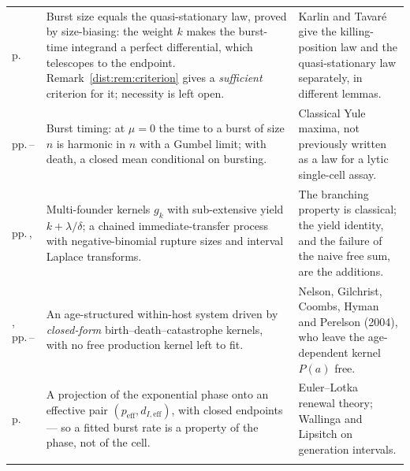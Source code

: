 {\begin{xltabular}{\linewidth}{@{}>{\raggedright\arraybackslash}p{20mm}O>{\raggedright\arraybackslash}p{40mm}@{}}
\newline p.\,\pageref{dist:thm:identity} &
Burst size equals the quasi-stationary law, proved by size-biasing: the weight $k$ makes
the burst-time integrand a perfect differential, which telescopes to the endpoint.
Remark~\ref{dist:rem:criterion} gives a \emph{sufficient} criterion for it; necessity is left open. &
Karlin and Tavar\'e give the killing-position law and the quasi-stationary law separately,
in different lemmas. \\
\addlinespace[5pt]

\newline pp.\,\pageref{dist:prop:taugivenk}--\pageref{dist:prop:tauburst} &
Burst timing: at $\mu=0$ the time to a burst of size $n$ is harmonic in $n$ with a Gumbel
limit; with death, a closed mean conditional on bursting. &
Classical Yule maxima, not previously written as a law for a lytic single-cell assay. \\
\addlinespace[5pt]

\newline pp.\,\pageref{dist:sec:moi}, \pageref{dist:sec:chained} &
Multi-founder kernels $g_k$ with sub-extensive yield $k+\lambda/\delta$; a chained
immediate-transfer process with negative-binomial rupture sizes and interval Laplace
transforms. &
The branching property is classical; the yield identity, and the failure of the naive free
sum, are the additions. \\
\addlinespace[5pt]

, \newline pp.\,\pageref{p:def:renewal-system}--\pageref{p:eq:skeleton} &
An age-structured within-host system driven by \emph{closed-form} birth--death--catastrophe
kernels, with no free production kernel left to fit. &
Nelson, Gilchrist, Coombs, Hyman and Perelson (2004), who leave the age-dependent kernel
$P(a)$ free. \\
\addlinespace[5pt]

\newline p.\,\pageref{p:thm:projection} &
A projection of the exponential phase onto an effective pair
$(p_{\mathrm{eff}},d_{I,\mathrm{eff}})$, with closed endpoints --- so a fitted burst rate
is a property of the phase, not of the cell. &
Euler--Lotka renewal theory; Wallinga and Lipsitch on generation intervals. \\
\addlinespace[5pt]


\end{xltabular}}
